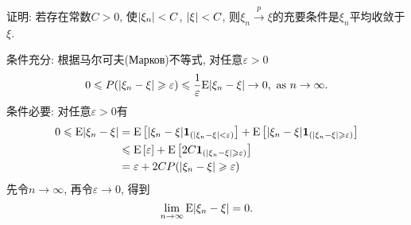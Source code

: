 	\begin{yyEx}
		证明: 若存在常数$C>0$, 使$\lvert\xi_n\rvert<C$, $\lvert\xi\rvert<C$, 则$\xi_n\stackrel{p}{\rightarrow}\xi$的充要条件是$\xi_n$平均收敛于$\xi$.
	\end{yyEx}
	
	\begin{yyProof}
		条件充分: 根据马尔可夫(Марков)不等式, 对任意$\varepsilon>0$\begin{equation}
			0\leqslant P(\lvert\xi_n-\xi\rvert\geqslant \varepsilon) \leqslant \frac{1}{\varepsilon}\mathrm{E}\lvert\xi_n - \xi\rvert \to 0,~\text{as}~n\to\infty.
		\end{equation}
		条件必要: 对任意$\varepsilon>0$有 \begin{align}
			0\leqslant \mathrm{E}\lvert\xi_n - \xi\rvert &= \mathrm{E}\left[\lvert\xi_n - \xi\rvert\bm{1}_{(\lvert\xi_n - \xi\rvert<\varepsilon)}\right] + \mathrm{E}\left[\lvert\xi_n - \xi\rvert\bm{1}_{(\lvert\xi_n - \xi\rvert\geqslant\varepsilon)}\right]\nonumber\\
			&\leqslant \mathrm{E}\left[\varepsilon\right] + \mathrm{E}\left[2C\bm{1}_{(\lvert\xi_n - \xi\rvert\geqslant\varepsilon)}\right]\nonumber\\
			&= \varepsilon + 2CP(\lvert\xi_n - \xi\rvert\geqslant\varepsilon)
		\end{align}
		先令$n\to\infty$, 再令$\varepsilon\to 0$, 得到
		\begin{equation}
			\lim_{n\to\infty}\mathrm{E}\lvert\xi_n - \xi\rvert = 0.
		\end{equation}
	\end{yyProof}
